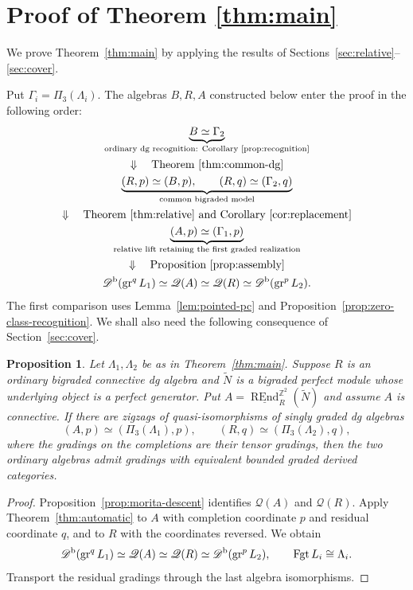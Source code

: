 \documentclass[12pt,a4paper,english,reqno]{amsart}
\theoremstyle{plain}
\newtheorem{prp}[thm]{Proposition}
\theoremstyle{definition}
\numberwithin{equation}{section}
\newcommand{\thmref}[1]{Theorem~\ref{#1}}
\newcommand{\prpref}[1]{Proposition~\ref{#1}}
\newcommand{\corref}[1]{Corollary~\ref{#1}}
\newcommand{\lemref}[1]{Lemma~\ref{#1}}
\def\Ga{\Gamma}
\def\La{\Lambda}
\def\Db{{\mathcal D}^{\text{\rm b}}}
\def\bbZ{{\mathbb Z}}
\def\iso{\cong}
\newcommand{\Fgt}{\operatorname{Fgt}}
\def\REnd{\operatorname{REnd}}
\def\gr{\operatorname{gr}}
\newcommand{\uREnd}{\underline{\REnd}}
\begin{document}
\section{Proof of Theorem \texorpdfstring{\ref{thm:main}}{1.1}}\label{sec:main-proof}
We prove \thmref{thm:main} by applying the results of Sections~\ref{sec:relative}--\ref{sec:cover}.

Put $\Ga_i=\Pi_3(\La_i)$. The algebras $B,R,A$ constructed below enter the proof in the following order:
\[
\begin{gathered}
 \underbrace{B\simeq\Ga_2}_{\text{ordinary dg recognition: \corref{prop:recognition}}}
 \\
 \Downarrow\quad\text{\thmref{thm:common-dg}}
 \\
 \underbrace{(R,p)\simeq(B,p),\qquad(R,q)\simeq(\Ga_2,q)}_{
   \text{common bigraded model}}
 \\
 \Downarrow\quad\text{\thmref{thm:relative} and \corref{cor:replacement}}
 \\
 \underbrace{(A,p)\simeq(\Ga_1,p)}_{
   \text{relative lift retaining the first graded realization}}
 \\
 \Downarrow\quad\text{\prpref{prop:assembly}}
 \\
 \Db(\gr^qL_1)\simeq\mathcal Q(A)
       \simeq\mathcal Q(R)\simeq\Db(\gr^pL_2).
\end{gathered}
\]
The first comparison uses \lemref{lem:pointed-pc} and \prpref{prop:zero-class-recognition}. We shall also need the following consequence of Section~\ref{sec:cover}.

\begin{prp}\label{prop:assembly}
Let $\La_1,\La_2$ be as in \thmref{thm:main}. Suppose $R$ is an ordinary bigraded connective dg algebra and $\widetilde N$ is a bigraded perfect module whose underlying object is a perfect generator. Put $A=\uREnd_R^{\bbZ^2}(\widetilde N)$ and assume $A$ is connective. If there are zigzags of quasi-isomorphisms of singly graded dg algebras
\[
 (A,p)\simeq(\Pi_3(\La_1),p),\qquad
 (R,q)\simeq(\Pi_3(\La_2),q),
\]
where the gradings on the completions are their tensor gradings, then the two ordinary algebras admit gradings with equivalent bounded graded derived categories.
\end{prp}
\begin{proof}
\prpref{prop:morita-descent} identifies $\mathcal Q(A)$ and $\mathcal Q(R)$. Apply \thmref{thm:automatic} to $A$ with completion coordinate $p$ and residual coordinate $q$, and to $R$ with the coordinates reversed. We obtain
\[
 \Db(\gr^qL_1)\simeq\mathcal Q(A)\simeq\mathcal Q(R)
       \simeq\Db(\gr^pL_2),\qquad \Fgt L_i\iso\La_i.
\]
Transport the residual gradings through the last algebra isomorphisms.
\end{proof}
\end{document}
